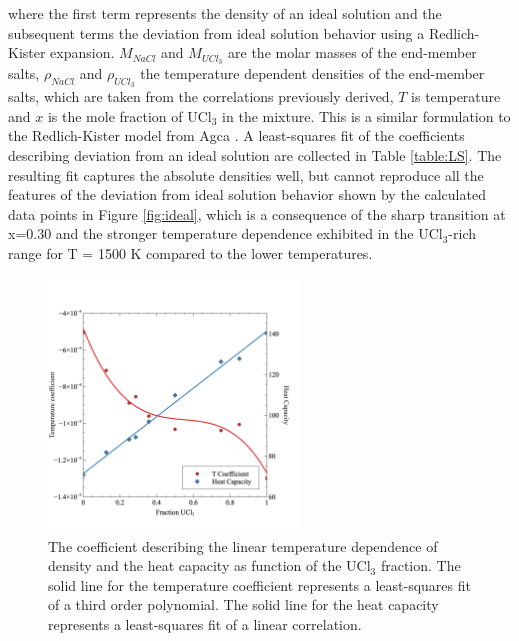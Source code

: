 \documentclass[preprint,3p,10pt,onecolumn,number,sort&compress]{elsarticle}
\begin{document}
{\noindent where the first term represents the density of an ideal solution and the subsequent terms the deviation from ideal solution behavior using a Redlich-Kister expansion. $M_{NaCl}$ and $M_{UCl_3}$ are the molar masses of the end-member salts, $\rho_{NaCl}$ and $\rho_{UCl_3}$ the temperature dependent densities of the end-member salts, which are taken from the correlations previously derived, $T$ is temperature and $x$ is the mole fraction of UCl$_3$ in the mixture. This is a similar formulation to the Redlich-Kister model from Agca \cite{agca2022}. A least-squares fit of the coefficients describing deviation from an ideal solution are collected in Table \ref{table:LS}. 
 The resulting fit captures the absolute densities well, but cannot reproduce all the features of the deviation from ideal solution behavior shown by the calculated data points in Figure \ref{fig:ideal}, which is a consequence of the sharp transition at x=0.30 and the stronger temperature dependence exhibited in the UCl$_3$-rich range for T = 1500 K compared to the lower temperatures. 

\begin{figure}[htb]
\centering
\includegraphics[width=0.6\textwidth]{fig8.jpg}
\caption{The coefficient describing the linear temperature dependence of density and the heat capacity as function of the UCl$_3$ fraction. The solid line for the temperature coefficient represents a least-squares fit of a third order polynomial. The solid line for the heat capacity represents a least-squares fit of a linear correlation.}
\label{fig:TandCp}
\end{figure}

}
\end{document}
